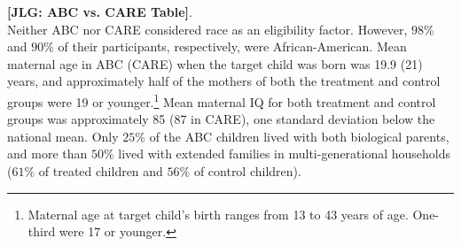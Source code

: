 \noindent \textbf{[JLG: ABC vs. CARE Table]}.\\

\noindent Neither ABC nor CARE considered race as an eligibility factor. However, $98\%$ and $90\%$ of their participants, respectively, were African-American. Mean maternal age in ABC (CARE) when the target child was born was 19.9 (21) years, and approximately half of the mothers of both the treatment and control groups were 19 or younger.\footnote{Maternal age at target child’s birth ranges from 13 to 43 years of age. One-third were 17 or younger.} Mean maternal IQ for both treatment and control groups was approximately 85 (87 in CARE), one standard deviation below the national mean. Only $25\%$ of the ABC children lived with both biological parents, and more than $50\%$ lived with extended families in multi-generational households ($61\%$ of treated children and $56\%$ of control children).\\

